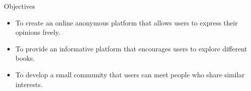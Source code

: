 \begin{alertblock}{Objectives}
\begin{itemize}
\item To create an online anonymous platform that allows users to express their opinions freely.
\item To provide an informative platform that encourages users to explore different books.
\item To develop a small community that users can meet people who share similar interests.
\end{itemize}
\end{alertblock}